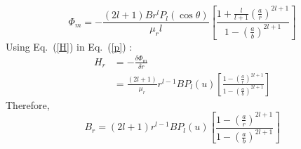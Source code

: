 \begin{equation}\label{p}
\Phi_m=-\frac{(2l+1)Br^lP_l(\cos\theta)}{\mu_r l}\left[\frac{1+\frac{l}{l+1}\left(\frac{a}{r}\right)^{2l+1}}{1-\left(\frac{a}{b}\right)^{2l+1}}\right]
\end{equation}
Using Eq.~(\ref{H}) in Eq.~(\ref{p}) :
\begin{equation}\label{Hr}
\begin{split}
    H_r &=-\frac{\delta \Phi_m}{\delta r}\\
      &=\frac{(2l+1)}{\mu_r}r^{l-1}BP_l(u)\left[\frac{1-\left(\frac{a}{r}\right)^{2l+1}}{1-\left(\frac{a}{b}\right)^{2l+1}}\right]
\end{split}
\end{equation}
Therefore,
\begin{equation}\label{Br}
B_r=(2l+1)r^{l-1}BP_l(u)\left[\frac{1-\left(\frac{a}{r}\right)^{2l+1}}{1-\left(\frac{a}{b}\right)^{2l+1}}\right]
\end{equation}

